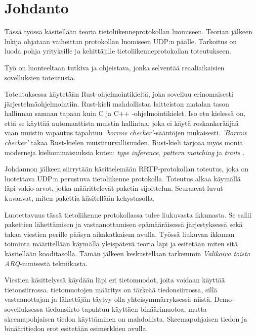 \documentclass[a4paper,12pt]{article}
\begin{document}
\pagestyle{plain}

    \section{Johdanto}\label{sec:johdanto}
    Tässä työssä käsitellään teoria tietoliikenneprotokollan luomiseen. Teorian jälkeen lukija ohjataan vaiheittan protokollan luomiseen UDP:n päälle. Tarkoitus on luoda pohja yrityksille ja kehittäjille tietoliikenneprotokollan toteutukseen.
    \par Työ on luonteeltaan tutkiva ja ohjeistava, jonka selventää reaaliaikaisien sovelluksien toteutusta.\par

Toteutuksessa käytetään Rust-ohjelmointikieltä, joka sovelluu erinomaisesti järjestelmäohjelmointiin. Rust-kieli mahdollistaa laitteiston matalan tason hallinnan
    samaan tapaan kuin C ja C++ -ohjelmointikielet. Iso etu kielessä on, että se käyttää automaattista muistin hallintaa, joka ei käytä roskankerääjää vaan muistin vapautus tapahtuu \textit{'borrow checker'}-sääntöjen mukaisesti.
    \textit{'Borrow checker'} takaa Rust-kielen muistiturvallisuuden. 
    Rust-kieli tarjoaa myös monia moderneja kieliominaisuuksia kuten: \textit{type
    inference, pattern matching} ja \textit{traits} \cite{rust-book}.

    Johdannon jälkeen siirrytään käsittelemään RRTP-protokollan toteutus, joka on luotettava UDP:n perustuva tietoliikenne protokolla.
    Toteutus alkaa käymällä läpi vakio-arvot, jotka määrittelevät paketin sijoittelun. Seuraavat luvut kuvaavat, miten pakettia käsitellään kehystasolla. \par

    Luotettavuus tässä tietoliikenne protokollassa tulee liukuvasta ikkunasta. Se sallii pakettien lähettämisen ja vastaanottamisen epämääräisessä järjestyksessä sekä takaa viestien perille pääsyn aikakatkaisun avulla. Työssä liukuvan ikkunan toiminta määritellään käymällä yleispätevä teoria läpi ja esitetään miten sitä käsitellään kooditasolla. Tämän jälkeen keskustellaan tarkemmin \textit{Valikoiva toisto ARQ}-nimisestä tekniikasta.

    Viestien käsittelyssä käydään läpi eri tietomuodot, joita voidaan käyttää tietonsiirrossa. tietomuotojen määritys on tärkeää tiedonsiirrossa, sillä vastaanottajan ja lähettäjän täytyy olla yhteisymmärryksessä niistä. Demo-sovelluksessa tiedonsiirto tapahtuu käyttäen binäärimuotoa, mutta skeemapohjaisen tiedon käyttäminen on mahdollista. Skeemapohjaisen tiedon ja binääritiedon erot esitetään esimerkkien avulla.\par
\end{document}
